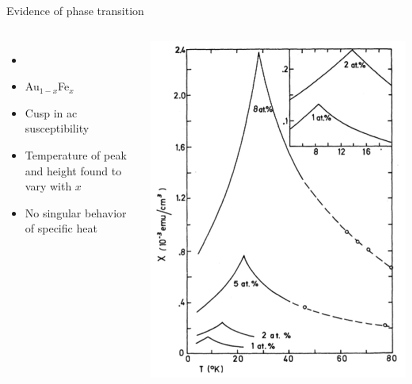 \documentclass{beamer}
\begin{document}
\begin{frame}{Evidence of phase transition}
  \begin{columns}
    \begin{itemize}
      \item \textcite{cannella1972magnetic}
      \item Au$_{1-x}$Fe$_x$
      \item Cusp in ac susceptibility
      \item Temperature of peak and height found to vary with $x$
      \item No singular behavior of specific heat
    \end{itemize}
    \includegraphics[width=\columnwidth]{ac-susc}
  \end{columns}
\end{frame}
\end{document}
